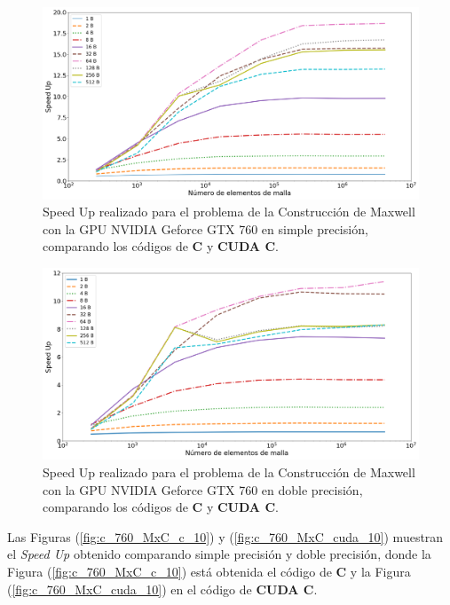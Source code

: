 \begin{figure}[h!]
	\centering
	\includegraphics[width=\textwidth]{figs/cap4/s_760_MxC_simple_10}
	\caption{Speed Up realizado para el problema de la Construcción de Maxwell con la GPU NVIDIA Geforce GTX 760 en simple precisión, comparando los códigos de \textbf{C} y \textbf{CUDA C}.} 
	\label{fig:s_760_MxC_simple_1.0}	
\end{figure}

\begin{figure}[h!]
	\centering
	\includegraphics[width=\textwidth]{figs/cap4/s_760_MxC_double_10}
	\caption{Speed Up realizado para el problema de la Construcción de Maxwell con la GPU NVIDIA Geforce GTX 760 en doble precisión, comparando los códigos de \textbf{C} y \textbf{CUDA C}.} 
	\label{fig:s_760_MxC_double_1.0}	
\end{figure}

\newpage

Las Figuras (\ref{fig:c_760_MxC_c_10}) y (\ref{fig:c_760_MxC_cuda_10}) muestran el \textit{Speed Up} obtenido comparando simple precisión y doble precisión, donde la Figura (\ref{fig:c_760_MxC_c_10}) está obtenida el código de \textbf{C} y la Figura (\ref{fig:c_760_MxC_cuda_10}) en el código de \textbf{CUDA C}. 


